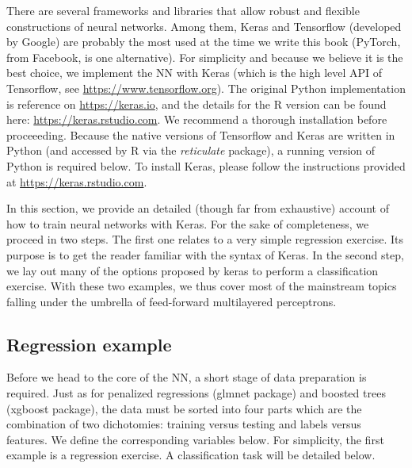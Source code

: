 \documentclass[]{krantz}
\makeatletter
\newenvironment{Shaded}{\begin{snugshade}}{\end{snugshade}}
\newcommand{\CommentTok}[1]{\textcolor[rgb]{0.37,0.37,0.37}{\textit{#1}}}
\newcommand{\KeywordTok}[1]{\textcolor[rgb]{0.27,0.27,0.27}{\textbf{#1}}}
\newcommand{\NormalTok}[1]{#1}
\newcommand{\OperatorTok}[1]{\textcolor[rgb]{0.43,0.43,0.43}{\textbf{#1}}}
\newcommand{\StringTok}[1]{\textcolor[rgb]{0.5,0.5,0.5}{#1}}
\newenvironment{kframe}{%
\medskip{}
\setlength{\fboxsep}{.8em}
 \def\at@end@of@kframe{}%
 \ifinner\ifhmode%
  \def\at@end@of@kframe{\end{minipage}}%
  \begin{minipage}{\columnwidth}%
 \fi\fi%
 \def\FrameCommand##1{\hskip\@totalleftmargin \hskip-\fboxsep
 \colorbox{shadecolor}{##1}\hskip-\fboxsep
     \hskip-\linewidth \hskip-\@totalleftmargin \hskip\columnwidth}%
 \MakeFramed {\advance\hsize-\width
   \@totalleftmargin\z@ \linewidth\hsize
   \@setminipage}}%
 {\par\unskip\endMakeFramed%
 \at@end@of@kframe}
\renewenvironment{Shaded}{\begin{kframe}}{\end{kframe}}
\theoremstyle{definition}
\theoremstyle{definition}
\theoremstyle{definition}
\theoremstyle{remark}
\makeatother
\begin{document}
There are several frameworks and libraries that allow robust and
flexible constructions of neural networks. Among them, Keras and
Tensorflow (developed by Google) are probably the most used at the time
we write this book (PyTorch, from Facebook, is one alternative). For
simplicity and because we believe it is the best choice, we implement
the NN with Keras (which is the high level API of Tensorflow, see
\url{https://www.tensorflow.org}). The original Python implementation is
reference on \url{https://keras.io}, and the details for the R version
can be found here: \url{https://keras.rstudio.com}. We recommend a
thorough installation before proceeeding. Because the native versions of
Tensorflow and Keras are written in Python (and accessed by R via the
\emph{reticulate} package), a running version of Python is required
below. To install Keras, please follow the instructions provided at
\url{https://keras.rstudio.com}.

In this section, we provide an detailed (though far from exhaustive)
account of how to train neural networks with Keras. For the sake of
completeness, we proceed in two steps. The first one relates to a very
simple regression exercise. Its purpose is to get the reader familiar
with the syntax of Keras. In the second step, we lay out many of the
options proposed by keras to perform a classification exercise. With
these two examples, we thus cover most of the mainstream topics falling
under the umbrella of feed-forward multilayered perceptrons.

\hypertarget{regression-example}{%
\subsection{Regression example}\label{regression-example}}

Before we head to the core of the NN, a short stage of data preparation
is required. Just as for penalized regressions (glmnet package) and
boosted trees (xgboost package), the data must be sorted into four parts
which are the combination of two dichotomies: training versus testing
and labels versus features. We define the corresponding variables below.
For simplicity, the first example is a regression exercise. A
classification task will be detailed below.

\footnotesize

\begin{Shaded}
\end{Shaded}
\end{document}
